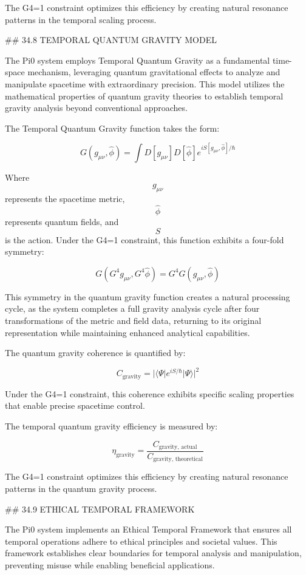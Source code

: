 The G4=1 constraint optimizes this efficiency by creating natural resonance patterns in the temporal scaling process.

## 34.8 TEMPORAL QUANTUM GRAVITY MODEL

The Pi0 system employs Temporal Quantum Gravity as a fundamental time-space mechanism, leveraging quantum gravitational effects to analyze and manipulate spacetime with extraordinary precision. This model utilizes the mathematical properties of quantum gravity theories to establish temporal gravity analysis beyond conventional approaches.

The Temporal Quantum Gravity function takes the form:

$$ G(g_{\mu\nu}, \hat{\phi}) = \int D[g_{\mu\nu}] D[\hat{\phi}] e^{iS[g_{\mu\nu}, \hat{\phi}]/\hbar} $$

Where $$ g_{\mu\nu} $$ represents the spacetime metric, $$ \hat{\phi} $$ represents quantum fields, and $$ S $$ is the action. Under the G4=1 constraint, this function exhibits a four-fold symmetry:

$$ G(G^4 g_{\mu\nu}, G^4 \hat{\phi}) = G^4 G(g_{\mu\nu}, \hat{\phi}) $$

This symmetry in the quantum gravity function creates a natural processing cycle, as the system completes a full gravity analysis cycle after four transformations of the metric and field data, returning to its original representation while maintaining enhanced analytical capabilities.

The quantum gravity coherence is quantified by:

$$ C_{\text{gravity}} = |\langle \Psi | e^{iS/\hbar} | \Psi \rangle|^2 $$

Under the G4=1 constraint, this coherence exhibits specific scaling properties that enable precise spacetime control.

The temporal quantum gravity efficiency is measured by:

$$ \eta_{\text{gravity}} = \frac{C_{\text{gravity, actual}}}{C_{\text{gravity, theoretical}}} $$

The G4=1 constraint optimizes this efficiency by creating natural resonance patterns in the quantum gravity process.

## 34.9 ETHICAL TEMPORAL FRAMEWORK

The Pi0 system implements an Ethical Temporal Framework that ensures all temporal operations adhere to ethical principles and societal values. This framework establishes clear boundaries for temporal analysis and manipulation, preventing misuse while enabling beneficial applications.

